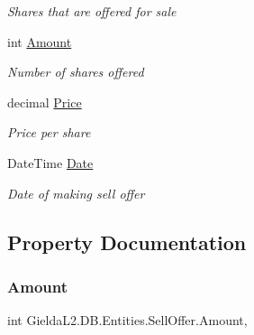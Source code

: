 \begin{DoxyCompactItemize}
\begin{DoxyCompactList}\small\item\em Shares that are offered for sale \end{DoxyCompactList}\item 
int \mbox{\hyperlink{class_gielda_l2_1_1_d_b_1_1_entities_1_1_sell_offer_a859b9daefceda69ff1520c4192a39335}{Amount}}
\begin{DoxyCompactList}\small\item\em Number of shares offered \end{DoxyCompactList}\item 
decimal \mbox{\hyperlink{class_gielda_l2_1_1_d_b_1_1_entities_1_1_sell_offer_a857ee5461635c6d2e07e6dd3bd4397e4}{Price}}
\begin{DoxyCompactList}\small\item\em Price per share \end{DoxyCompactList}\item 
Date\+Time \mbox{\hyperlink{class_gielda_l2_1_1_d_b_1_1_entities_1_1_sell_offer_ac869464f80621e93d905986a964ad100}{Date}}
\begin{DoxyCompactList}\small\item\em Date of making sell offer \end{DoxyCompactList}\end{DoxyCompactItemize}


\subsection{Property Documentation}
\mbox{\label{class_gielda_l2_1_1_d_b_1_1_entities_1_1_sell_offer_a859b9daefceda69ff1520c4192a39335}} 
\subsubsection{\texorpdfstring{Amount}{Amount}}
{\footnotesize\ttfamily int Gielda\+L2.\+D\+B.\+Entities.\+Sell\+Offer.\+Amount\hspace{0.3cm}{\ttfamily [get]}, {\ttfamily [set]}}



